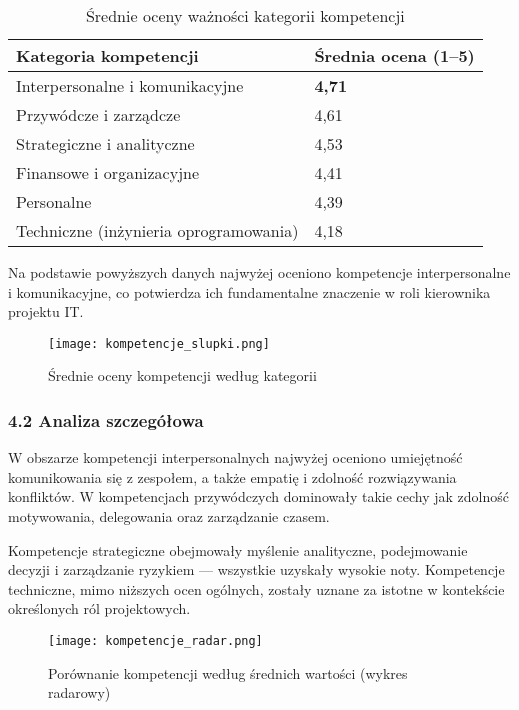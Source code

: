 \begin{table}[H]
\centering
\caption{Średnie oceny ważności kategorii kompetencji}
\begin{tabular}{ll}
\toprule
\textbf{Kategoria kompetencji} & \textbf{Średnia ocena (1–5)} \\
\midrule
Interpersonalne i komunikacyjne          & \textbf{4{,}71} \\
Przywódcze i zarządcze                   & 4{,}61 \\
Strategiczne i analityczne               & 4{,}53 \\
Finansowe i organizacyjne                & 4{,}41 \\
Personalne                               & 4{,}39 \\
Techniczne (inżynieria oprogramowania)   & 4{,}18 \\
\bottomrule
\end{tabular}
\end{table}

Na podstawie powyższych danych najwyżej oceniono kompetencje interpersonalne i komunikacyjne, co potwierdza ich fundamentalne znaczenie w roli kierownika projektu IT.

\begin{figure}[H]
\centering
\texttt{[image: kompetencje\_slupki.png]}
\caption{Średnie oceny kompetencji według kategorii}
\end{figure}

\subsubsection*{4.2 Analiza szczegółowa}

W obszarze kompetencji interpersonalnych najwyżej oceniono umiejętność komunikowania się z zespołem, a także empatię i zdolność rozwiązywania konfliktów. W kompetencjach przywódczych dominowały takie cechy jak zdolność motywowania, delegowania oraz zarządzanie czasem.

Kompetencje strategiczne obejmowały myślenie analityczne, podejmowanie decyzji i zarządzanie ryzykiem — wszystkie uzyskały wysokie noty. Kompetencje techniczne, mimo niższych ocen ogólnych, zostały uznane za istotne w kontekście określonych ról projektowych.

\begin{figure}[H]
\centering
\texttt{[image: kompetencje\_radar.png]}
\caption{Porównanie kompetencji według średnich wartości (wykres radarowy)}
\end{figure}

